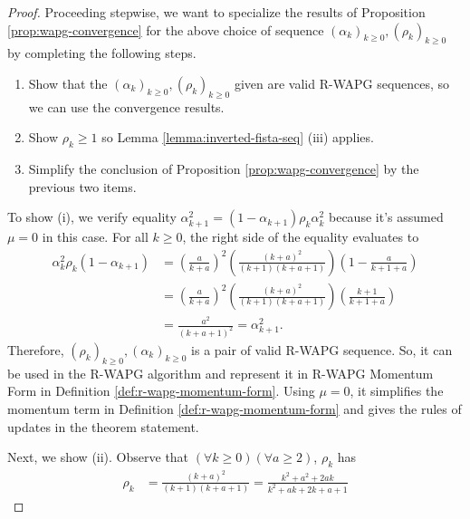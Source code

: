 \documentclass[12pt]{article}
\begin{document}
    \begin{proof}
        Proceeding stepwise, we want to specialize the results of Proposition \ref{prop:wapg-convergence} for the above choice of sequence $(\alpha_k)_{k \ge 0}, (\rho_k)_{k \ge 0}$  by completing the following steps.
        \begin{enumerate}
            \item Show that the $(\alpha_k)_{k \ge 0}, (\rho_k)_{k \ge 0}$ given are valid R-WAPG sequences, so we can use the convergence results.
            \item Show $\rho_k \ge 1$ so Lemma \ref{lemma:inverted-fista-seq} (iii) applies.
            \item Simplify the conclusion of Proposition \ref{prop:wapg-convergence} by the previous two items.
        \end{enumerate}
        To show (i), we verify equality $\alpha_{k + 1}^2 = (1 - \alpha_{k + 1})\rho_k \alpha_k^2$ because it's assumed $\mu = 0$ in this case.
        For all $k \ge 0$, the right side of the equality evaluates to
        \begin{align*}
            \alpha_k^2 \rho_k(1 - \alpha_{k + 1}) &=
            \left(
                \frac{a}{k + a}
            \right)^2 \left(
                \frac{(k + a)^2}{(k + 1)(k + a + 1)}
            \right)
            \left(
                1 - \frac{a}{k + 1 + a}
            \right)
            \\
            &= \left(
                \frac{a}{k + a}
            \right)^2 \left(
                \frac{(k + a)^2}{(k + 1)(k + a + 1)}
            \right)
            \left(
                \frac{k + 1}{k + 1 + a}
            \right)
            \\
            &= \frac{a^2}{(k + a + 1)^2} = \alpha_{k + 1}^2.
        \end{align*}
        Therefore, $(\rho_k)_{k \ge 0}, (\alpha_k)_{k \ge 0}$ is a pair of valid R-WAPG sequence.
        So, it can be used in the R-WAPG algorithm and represent it in R-WAPG Momentum Form in Definition \ref{def:r-wapg-momentum-form}.
        Using $\mu = 0$, it simplifies the momentum term in Definition \ref{def:r-wapg-momentum-form} and gives the rules of updates in the theorem statement.
        \par
        Next, we show (ii).
        Observe that $(\forall k \ge 0)(\forall a \ge 2)$, $\rho_k$ has
        \begin{align*}
            \rho_k &= \frac{(k + a)^2}{(k + 1)(k + a + 1)} = \frac{k^2 + a^2 + 2ak}{k^2 + ak + 2k + a + 1}

\end{align*}
\end{proof}
\end{document}
